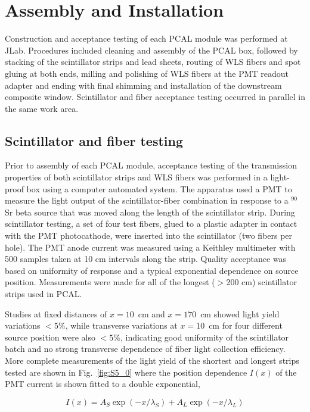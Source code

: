\section{Assembly and Installation}
Construction and acceptance testing of each PCAL module was performed at JLab.  Procedures included cleaning and assembly of the PCAL box, followed by stacking of the scintillator strips and lead sheets, routing of WLS fibers and spot gluing at both ends, milling and polishing of WLS fibers at the PMT readout adapter and ending with final shimming and installation of the downstream composite window.  Scintillator and fiber acceptance testing occurred in parallel in the same work area.


\subsection{Scintillator and fiber testing}
Prior to assembly of each PCAL module, acceptance testing of the transmission properties of both scintillator strips and WLS fibers was performed in a light-proof box using a computer automated system.  The apparatus used a PMT to measure the light output of the scintillator-fiber combination in response to a $^{90}$Sr beta source that was moved along the length of the scintillator strip. During scintillator testing, a set of four test fibers, glued to a plastic adapter in contact with the PMT photocathode, were inserted into the scintillator (two fibers per hole).  The PMT anode current was measured using a Keithley multimeter with 500 samples taken at 10 cm intervals along the strip.  Quality acceptance was based on uniformity of response and a typical exponential dependence on source position. Measurements were made for all of the longest ($>$200 cm) scintillator strips used in PCAL.

Studies at fixed distances of $x=10$~cm and $x=170$~cm showed light yield variations $<5\%$, while transverse variations at $x=10$~cm for four different source position were also $<5\%$, indicating good uniformity of the scintillator batch and no strong transverse dependence of fiber light collection efficiency.  More complete measurements of the light yield of the shortest and longest strips tested are shown in Fig.~\ref{fig:S5_0} where the position dependence $I(x)$ of the PMT current is shown fitted to a double exponential,

\begin{equation}
I(x) = A_S \exp(-x/\lambda_S)+A_L \exp(-x/\lambda_L)
\end{equation}

